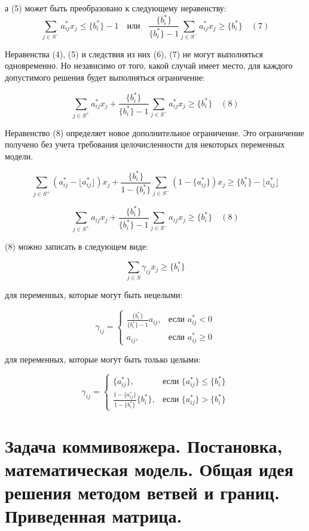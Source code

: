 \documentclass[17pt]{extarticle}
\begin{document}
а (5) может быть преобразовано к следующему неравенству:
\[
    \sum_{j \in S^-} a_{ij}^* x_j \leq \{b_i^*\} - 1 \quad \text{или} \quad \frac{\{b_i^*\}}{\{b_i^*\} - 1} \sum_{j \in S^-} a_{ij}^* x_j \geq \{b_i^*\} \quad (7)
\]

Неравенства (4), (5) и следствия из них (6), (7) не могут выполняться одновременно. Но независимо от того, какой случай имеет место, для каждого допустимого решения будет выполняться ограничение:

\[
    \sum_{j \in S^+} a_{ij}^* x_j + \frac{\{b_i^*\}}{\{b_i^*\} - 1} \sum_{j \in S^-} a_{ij}^* x_j \geq \{b_i^*\} \quad (8)
\]

Неравенство (8) определяет новое дополнительное ограничение.
Это ограничение получено без учета требования целочисленности для некоторых переменных модели.

\[
    \sum_{j \in S^+} (a_{ij}^* - \lfloor a_{ij}^* \rfloor) x_j + \frac{\{b_i^*\}}{1 - \{b_i^*\}} \sum_{j \in S^-} (1 - \{a_{ij}^*\}) x_j
    \geq
    \{b_i^*\} - \lfloor a_{ij}^* \rfloor
\]

\[
    \sum_{j \in S^+} a_{ij}x_j + \frac{\{b_i^*\}}{\{b_i^*\} - 1} \sum_{j \in S^-} a_{ij}x_j \geq \{b_i^*\} \quad (8)
\]

(8) можно записать в следующем виде:

\[
    \sum_{j \in S} \gamma_{ij}x_j \geq \{b_i^*\}
\]

для переменных, которые могут быть нецелыми:

\[
    \gamma_{ij} =
    \begin{cases}
        \frac{\{b_i^*\}}{\{b_i^*\} - 1} a_{ij}, & \text{если } a_{ij}^* < 0    \\
        a_{ij},                                 & \text{если } a_{ij}^* \geq 0
    \end{cases}
\]

для переменных, которые могут быть только целыми:

\[
    \gamma_{ij} =
    \begin{cases}
        \{a_{ij}^*\},                                     & \text{если } \{a_{ij}^*\} \leq \{b_i^*\} \\
        \frac{1 - \{a_{ij}^*\}}{1 - \{b_i^*\}} \{b_i^*\}, & \text{если } \{a_{ij}^*\} > \{b_i^*\}
    \end{cases}
\]




\section{Задача коммивояжера. Постановка, математическая модель. Общая идея решения методом ветвей и границ. Приведенная матрица.}
\end{document}
